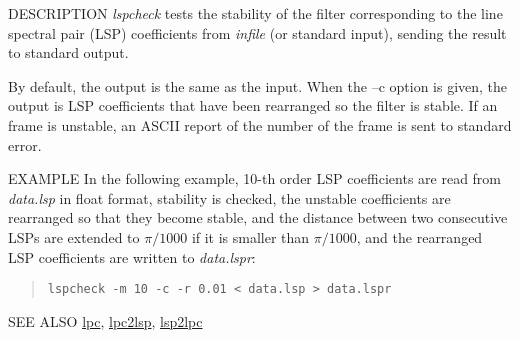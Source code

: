 \begin{synopsis}
\item [lspcheck] [ --m $M$ ] [ --s $S$ ] [ --k ] [ --L ] [ --q $Q$ ] [ --o $O$ ]
		[ --r $R$] [ --G $G$ ] [ --g ] [ {\em infile} ]
\end{synopsis}

\begin{qsection}{DESCRIPTION}
{\em lspcheck} tests the stability of the filter 
corresponding to the line spectral pair (LSP) coefficients 
from {\em infile} (or standard input), 
sending the result to standard output.

By default, the output is the same as the input.
When the --c option is given,
the output is LSP coefficients
that have been rearranged so the filter is stable.
If an frame is unstable, an ASCII report of the number of the frame
is sent to standard error.
\end{qsection}

\begin{options}
\end{options}

\begin{qsection}{EXAMPLE}
In the following example, 10-th order LSP coefficients are
read from {\em data.lsp} in float format,
stability is checked, the unstable coefficients are rearranged
so that they become stable, and the distance between two
consecutive LSPs are extended to $\pi /1000$ if
 it is smaller than $\pi /1000$, and the
 rearranged LSP coefficients are written to {\em data.lspr}:
\begin{quote}
\verb!lspcheck -m 10 -c -r 0.01 < data.lsp > data.lspr!
\end{quote}
\end{qsection}

\begin{qsection}{SEE ALSO}
\hyperlink{lpc}{lpc},
\hyperlink{lpc2lsp}{lpc2lsp},
\hyperlink{lsp2lpc}{lsp2lpc}
\end{qsection}
